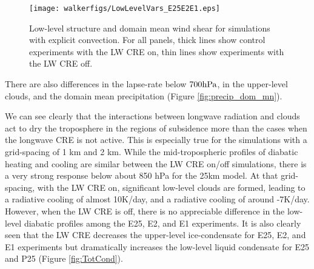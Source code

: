\documentclass[11pt]{article}   	%
\begin{document}
\begin{figure}
  \centering
    \texttt{[image: walkerfigs/LowLevelVars\_E25E2E1.eps]}
    \caption{Low-level structure and domain mean wind shear for simulations with explicit convection.  
    For all panels, thick lines show control experiments with the LW CRE on, thin lines show experiments
    with the LW CRE off.}
    \label{fig:enthalpy}
\end{figure}
  
  
  


There are also differences in the lapse-rate below $700 \rm{hPa}$, in the upper-level clouds,
and the domain mean precipitation (Figure \ref{fig:precip_dom_mn}).
  
We can see clearly that the interactions between longwave radiation and clouds act to dry the troposphere in the regions of subsidence 
more than the cases when the longwave CRE is not active.  This is especially true for the simulations with a grid-spacing of 1 km 
and 2 km.  While the mid-tropospheric profiles of diabatic heating and cooling are similar between the LW CRE on/off simulations, 
there is a very strong response below about 850 hPa for the 25km model.  At that grid-spacing, with the 
LW CRE on, significant low-level clouds are formed, leading to a radiative cooling of almost 10K/day, 
and a radiative cooling of around -7K/day.   However, when the LW CRE is off, there is no appreciable 
difference in the low-level diabatic profiles among the E25, E2, and E1 experiments.   It 
is also clearly seen that the LW CRE decreases the upper-level ice-condensate for E25, E2, and E1 
experiments but dramatically increases the low-level liquid condensate for E25 and P25 (Figure 
\ref{fig:TotCond}).  
\end{document}
